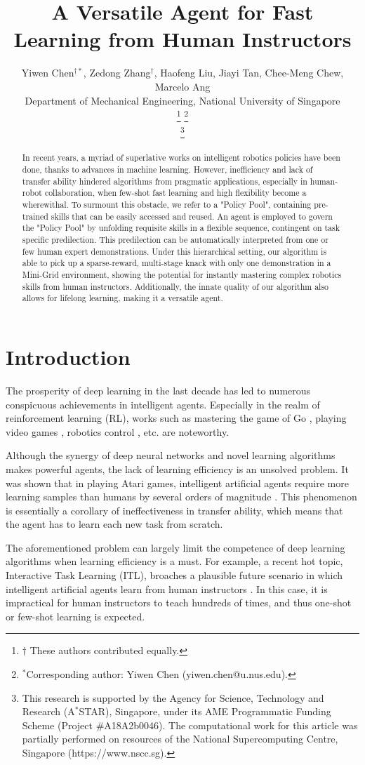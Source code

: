 \documentclass[conference]{IEEEtran}
\title{A Versatile Agent for Fast Learning from Human Instructors}
\author {
    Yiwen Chen$^{\dag *}$,
    Zedong Zhang$^{\dag}$,
    Haofeng Liu, 
    Jiayi Tan,
    Chee-Meng Chew,
    Marcelo Ang
\\Department of Mechanical Engineering, National University of Singapore

\thanks{$\dag$ These authors contributed equally.}
\thanks{$^{*}$Corresponding author: Yiwen Chen  (yiwen.chen@u.nus.edu).}

\thanks{This research is supported by the Agency for Science, Technology and Research (A$^{*}$STAR), Singapore, under its AME Programmatic Funding Scheme (Project $\#$A18A2b0046). The computational work for this article was partially performed on resources of the National Supercomputing Centre, Singapore (https://www.nscc.sg).}
}
\begin{document}
\maketitle

\begin{abstract}
In recent years, a myriad of superlative works on intelligent robotics policies have been done, thanks to advances in machine learning. However, inefficiency and lack of transfer ability hindered algorithms from pragmatic applications, especially in human-robot collaboration, when few-shot fast learning and high flexibility become a wherewithal. To surmount this obstacle, we refer to a "Policy Pool", containing pre-trained skills that can be easily accessed and reused. An agent is employed to govern the "Policy Pool" by unfolding requisite skills in a flexible sequence, contingent on task specific predilection. This predilection can be automatically interpreted from one or few human expert demonstrations. Under this hierarchical setting, our algorithm is able to pick up a sparse-reward, multi-stage knack with only one demonstration in a Mini-Grid environment, showing the potential for instantly mastering complex robotics skills from human instructors. Additionally, the innate quality of our algorithm also allows for lifelong learning, making it a versatile agent.
\end{abstract}

\section{Introduction}
The prosperity of deep learning in the last decade has led to numerous conspicuous achievements in intelligent agents. Especially in the realm of reinforcement learning (RL), works such as mastering the game of Go \cite{silver2016mastering}, playing video games \cite{mnih2015human}, robotics control \cite{amarjyoti2017deep}, etc. are noteworthy. 

Although the synergy of deep neural networks and novel learning algorithms makes powerful agents, the lack of learning efficiency is an unsolved problem. It was shown that in playing Atari games, intelligent artificial agents require more learning samples than humans by several orders of magnitude \cite{tsividis2017human}. This phenomenon is essentially a corollary of ineffectiveness in transfer ability, which means that the agent has to learn each new task from scratch.

The aforementioned problem can largely limit the competence of deep learning algorithms when learning efficiency is a must. For example, a recent hot topic, Interactive Task Learning (ITL), broaches a plausible future scenario in which intelligent artificial agents learn from human instructors \cite{laird2017interactive}. In this case, it is impractical for human instructors to teach hundreds of times, and thus one-shot or few-shot learning is expected.
\end{document}
